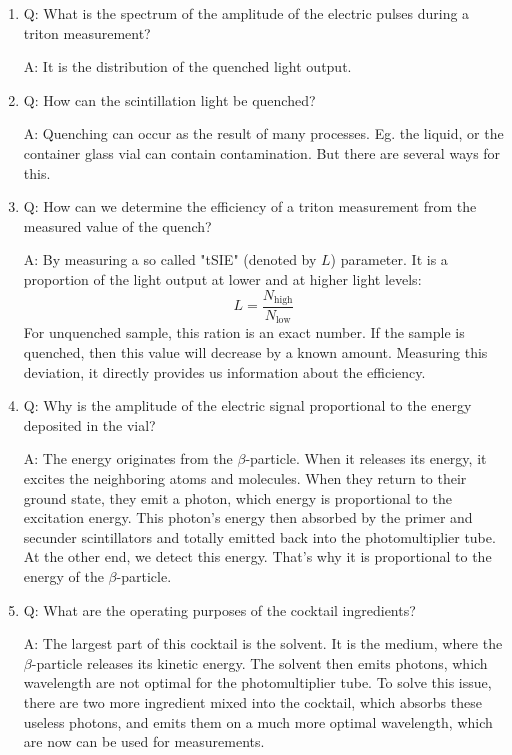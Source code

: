 \begin{enumerate}
    \item Q: What is the spectrum of the amplitude of the electric pulses during a triton
measurement?
    \begin{displayquote}
        A: It is the distribution of the quenched light output.
    \end{displayquote}
    \newpage
    \item Q: How can the scintillation light be quenched?
    \begin{displayquote}
        A: Quenching can occur as the result of many processes. Eg. the liquid, or the container glass vial can contain contamination. But there are several ways for this.
    \end{displayquote}
    
    \item Q: How can we determine the efficiency of a triton measurement from the measured
value of the quench?
    \begin{displayquote}
        A: By measuring a so called "tSIE" (denoted by $L$) parameter. It is a proportion of the light output at lower and at higher light levels:
        \begin{equation}
        L = \frac{N_{\text{high}}}{N_{\text{low}}}
        \end{equation}
For unquenched sample, this ration is an exact number. If the sample is quenched, then this value will decrease by a known amount. Measuring this deviation, it directly provides us information about the efficiency.
    \end{displayquote}
    
    \item Q: Why is the amplitude of the electric signal proportional to the energy deposited in the vial?
    \begin{displayquote}
        A: The energy originates from the $\beta$-particle. When it releases its energy, it excites the neighboring atoms and molecules. When they return to their ground state, they emit a photon, which energy is proportional to the excitation energy. This photon's energy then absorbed by the primer and secunder scintillators and totally emitted back into the photomultiplier tube. At the other end, we detect this energy. That's why it is proportional to the energy of the $\beta$-particle.
    \end{displayquote}
    
    \item Q: What are the operating purposes of the cocktail ingredients?
    \begin{displayquote}
        A: The largest part of this cocktail is the solvent. It is the medium, where the $\beta$-particle releases its kinetic energy. The solvent then emits photons, which wavelength are not optimal for the photomultiplier tube. To solve this issue, there are two more ingredient mixed into the cocktail, which absorbs these useless photons, and emits them on a much more optimal wavelength, which are now can be used for measurements.
    \end{displayquote}
    

\end{enumerate}
